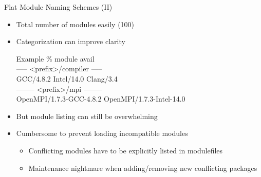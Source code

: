 \documentclass[10pt,xcolor={usenames,dvipsnames}]{beamer}
\begin{document}

\begin{frame}{Flat Module Naming Schemes (II)}
\begin{itemize}
    \item
        Total number of modules easily (100)
    \item
        Categorization can improve clarity\\
        \enskip
        \begin{minipage}{0.9\textwidth}
            \begin{exampleblock}{Example}
                \ttfamily
                \% module avail\\
                ----- <prefix>/compiler -----\\
                GCC/4.8.2 \quad Intel/14.0 \quad Clang/3.4\\
                -------- <prefix>/mpi --------\\
                OpenMPI/1.7.3-GCC-4.8.2 \quad OpenMPI/1.7.3-Intel-14.0
            \end{exampleblock}
        \end{minipage}
    \smallskip
    \item
        But module listing can still be overwhelming
    \item
        Cumbersome to prevent loading incompatible modules
        \begin{itemize}
            \item
                Conflicting modules have to be explicitly listed in modulefiles
            \item
                Maintenance nightmare when adding/removing new conflicting
                packages
        \end{itemize}
\end{itemize}
\end{frame}

\end{document}
